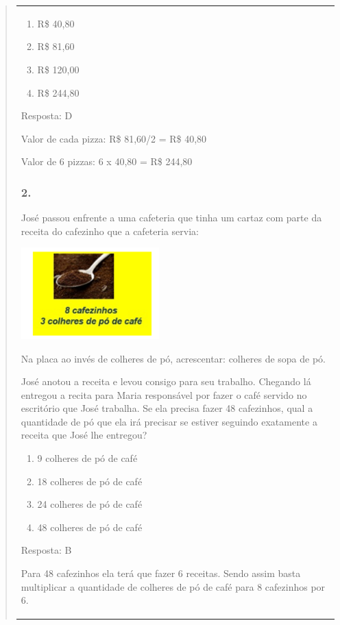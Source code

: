 \begin{enumerate}
\begin{escolha}
\begin{enumerate}
\begin{itemize}
\begin{itemize}
\begin{escolha}
\begin{quote}
\begin{escolha}
{\begin{longtable}[]{@{}l@{}}
\begin{itemize}
\begin{enumerate}
\def\labelenumi{\alph{enumi})}
\item
  R\$ 40,80
\item
  R\$ 81,60
\item
  R\$ 120,00
\item
  R\$ 244,80
\end{enumerate}

Resposta: D

Valor de cada pizza: R\$ 81,60/2 = R\$ 40,80

Valor de 6 pizzas: 6 x 40,80 = R\$ 244,80

\subsubsection{2.}\label{section-128}

José passou enfrente a uma cafeteria que tinha um cartaz com parte da
receita do cafezinho que a cafeteria servia:

\includegraphics[width=2.10018in,height=1.39179in]{media/image133.png}

Na placa ao invés de colheres de pó, acrescentar: colheres de sopa de
pó.

José anotou a receita e levou consigo para seu trabalho. Chegando lá
entregou a recita para Maria responsável por fazer o café servido no
escritório que José trabalha. Se ela precisa fazer 48 cafezinhos, qual a
quantidade de pó que ela irá precisar se estiver seguindo exatamente a
receita que José lhe entregou?

\begin{enumerate}
\def\labelenumi{\alph{enumi})}
\item
  9 colheres de pó de café
\item
  18 colheres de pó de café
\item
  24 colheres de pó de café
\item
  48 colheres de pó de café
\end{enumerate}

Resposta: B

Para 48 cafezinhos ela terá que fazer 6 receitas. Sendo assim basta
multiplicar a quantidade de colheres de pó de café para 8 cafezinhos por
6.


\end{itemize}
\end{longtable}}
\end{escolha}
\end{quote}
\end{escolha}
\end{itemize}
\end{itemize}
\end{enumerate}
\end{escolha}
\end{enumerate}
